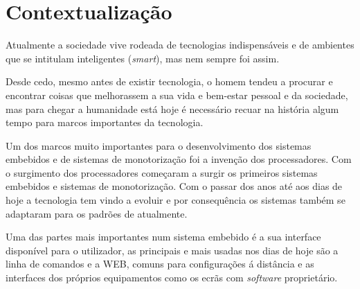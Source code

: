 \section{Contextualização}
\par
Atualmente a sociedade vive rodeada de tecnologias indispensáveis e de ambientes que se intitulam inteligentes (\textit{smart}), mas nem sempre foi assim.\par
Desde cedo, mesmo antes de existir tecnologia, o homem tendeu a procurar e encontrar coisas que melhorassem a sua vida e bem-estar pessoal e da sociedade, mas para chegar a humanidade está hoje é necessário recuar na história algum tempo para marcos importantes da tecnologia.\par
Um dos marcos muito importantes para o desenvolvimento dos sistemas embebidos e de sistemas de monotorização foi a invenção dos processadores. Com o surgimento dos processadores começaram a surgir os primeiros sistemas embebidos e sistemas de monotorização. Com o passar dos anos até aos dias de hoje a tecnologia tem vindo a evoluir e por consequência os sistemas também se adaptaram para os padrões de atualmente.\par
Uma das partes mais importantes num sistema embebido é a sua interface disponível para o utilizador, as principais e mais usadas nos dias de hoje são a linha de comandos e a WEB, comuns para configurações á distância e as interfaces dos próprios equipamentos como os ecrãs com \textit{software} proprietário.

